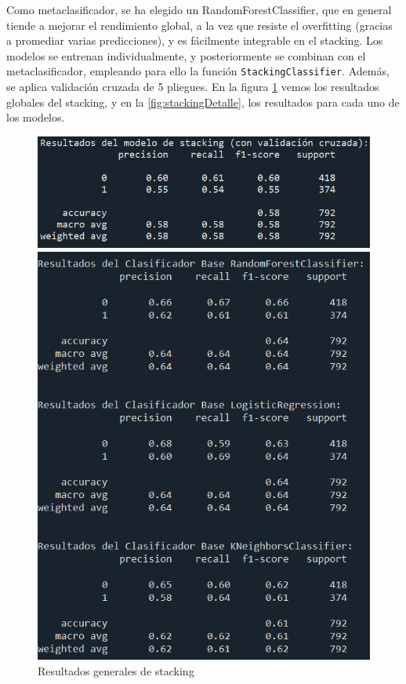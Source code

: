 \documentclass[a4paper,onecolumn]{extarticle}
\begin{document}
\begin{sloppypar}
Como metaclasificador, se ha elegido un RandomForestClassifier, que en general tiende a mejorar el rendimiento global, a la vez que resiste el overfitting (gracias 
a promediar varias predicciones), y es fácilmente integrable en el stacking. Los modelos se entrenan individualmente, y posteriormente se combinan con el metaclasificador,
empleando para ello la función \texttt{StackingClassifier}. Además, se aplica validación cruzada de 5 pliegues. En la figura \ref{fig:stackingGeneral} vemos los
resultados globales del stacking, y en la \ref{fig:stackingDetalle}, los resultados para cada uno de los modelos.
\begin{figure}[h!]
    \centering
    \begin{minipage}[c]{0.45\textwidth}
        \centering
        \includegraphics[width=\textwidth]{imgs/reportStacking.png}
        \caption{Resultados generales de stacking}
        \label{fig:stackingGeneral}
    \end{minipage}%
    \hspace{1em}  %
    \begin{minipage}[c]{0.45\textwidth}
        \centering
        \includegraphics[width=\textwidth]{imgs/reportStackingModelos.png}

\end{minipage}
\end{figure}
\end{sloppypar}
\end{document}
